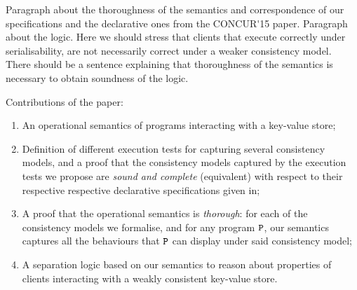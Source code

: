 
\ac{Paragraph about the thoroughness of the semantics and 
correspondence of our specifications and the declarative 
ones from the CONCUR'15 paper. Paragraph about the logic. 
Here we should stress that clients that execute correctly 
under serialisability, are not necessarily correct under a 
weaker consistency model. There should  be a sentence explaining 
that thoroughness of the semantics is necessary to obtain soundness 
of the logic.}

Contributions of the paper: 
\begin{enumerate}
\item An operational semantics of programs interacting with a key-value store; 
\item Definition of different execution tests for capturing several consistency models,
and a proof that the consistency models captured by the execution tests we propose 
are \emph{sound and complete} (equivalent) with respect to their respective  respective declarative specifications 
given in\cite{framework-concur};
\item A proof that the operational semantics is \emph{thorough}: for each of the 
consistency models we formalise, and for any program $\texttt{P}$, our semantics captures 
all the behaviours that $\texttt{P}$ can display under said consistency model;
\item A separation logic based on our semantics to reason about properties 
of clients interacting with a weakly consistent key-value store.
\end{enumerate}


